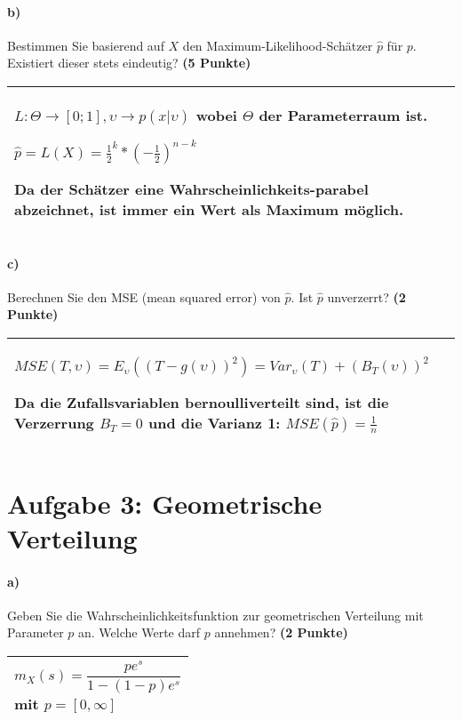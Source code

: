\documentclass[10pt, a4paper]{article}
\begin{document}
\paragraph{b)} Bestimmen Sie basierend auf $X$ den Maximum-Likelihood-Schätzer $\hat{p}$ für $p$. Existiert dieser stets eindeutig? \textbf{(5 Punkte)}\\
\begin{tabular}{| p{17cm} |}
    \hline
    $L:\Theta\rightarrow [0;1],\upsilon\rightarrow p(x|\upsilon)$ wobei $\Theta$ der Parameterraum ist.

    $\hat{p}= L(X)=\frac{1}{2}^k *(-\frac{1}{2})^{n-k}$

    Da der Schätzer eine Wahrscheinlichkeits-parabel abzeichnet, ist immer ein Wert als Maximum möglich.
    \\\hline
\end{tabular}

\paragraph{c)} Berechnen Sie den MSE (mean squared error) von $\hat{p}$. Ist $\hat{p}$ unverzerrt? \textbf{(2 Punkte)}\\
\begin{tabular}{| p{17cm} |}
    \hline
    $MSE(T,\upsilon)=E_{\upsilon}((T-g(\upsilon))^2) = Var_{\upsilon}(T)+(B_T(\upsilon))^2$
    
    Da die Zufallsvariablen bernoulliverteilt sind, ist die Verzerrung $B_T=0$ und die Varianz 1: $MSE(\hat{p})=\frac{1}{n}$

    \\\hline
\end{tabular}


\section{Aufgabe 3: Geometrische Verteilung}
\paragraph{a)} Geben Sie die Wahrscheinlichkeitsfunktion zur geometrischen Verteilung mit Parameter $p$ an. Welche Werte darf $p$ annehmen? \textbf{(2 Punkte)}\\
\begin{tabular}{| p{17cm} |}
    \hline
    $$m_X(s)=\frac{pe^s}{1-(1-p)e^s}$$ mit $p=[0,\infty]$
    \\\hline
\end{tabular}
\end{document}
